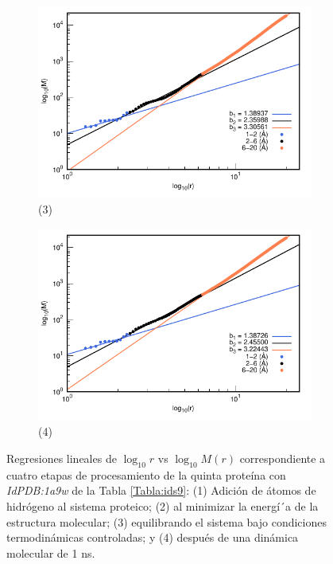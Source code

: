 \begin{figure}[H]
	\vspace{0cm} %
	
	\hspace{-0.3cm} 
	\begin{subfigure}{0.49\textwidth}
		\centering
		\includegraphics[width=\linewidth,page=1]{graphs/PDBs/1a9w/1a9wEq.pdf}
		\caption{(3)}
	\end{subfigure}
	\hspace{0.2cm}
	\begin{subfigure}{0.49\textwidth} %
		\centering
		\includegraphics[width=\linewidth,page=1]{graphs/PDBs/1a9w/1a9w1ns.pdf}
		\caption{(4)}
	\end{subfigure}
	\caption{Regresiones lineales de $\log_{10}r$ vs $\log_{10}M(r)$ correspondiente a cuatro etapas de procesamiento de la quinta prote\'{i}na con \textit{IdPDB:1a9w} de la Tabla \ref{Tabla:ids9}: (1) Adici\'{o}n de \'{a}tomos de hidr\'{o}geno al sistema proteico; (2) al minimizar la energ\'{i´}a de la estructura molecular; (3) equilibrando el sistema bajo condiciones termodin\'{a}micas controladas; y (4) despu\'{e}s de una din\'{a}mica molecular de 1 ns.}
	\label{fig:1a9w}
\end{figure}

